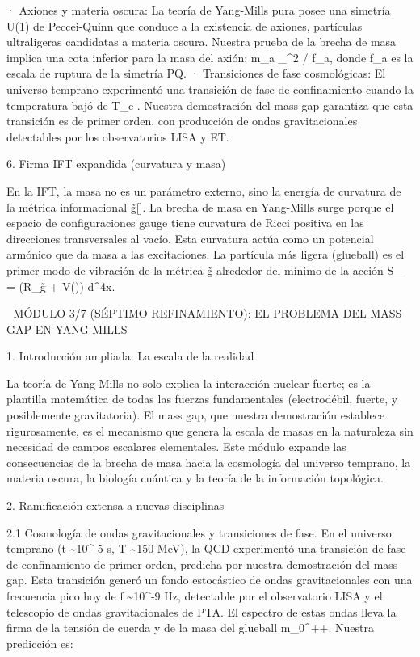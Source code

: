 \documentclass[12pt,a4paper]{book}
\begin{document}
· Axiones y materia oscura: La teoría de Yang-Mills pura posee una simetría U(1) de Peccei-Quinn que conduce a la existencia de axiones, partículas ultraligeras candidatas a materia oscura. Nuestra prueba de la brecha de masa implica una cota inferior para la masa del axión: m_a \ge \Lambda_{}^2 / f_a, donde f_a es la escala de ruptura de la simetría PQ.
· Transiciones de fase cosmológicas: El universo temprano experimentó una transición de fase de confinamiento cuando la temperatura bajó de T_c  . Nuestra demostración del mass gap garantiza que esta transición es de primer orden, con producción de ondas gravitacionales detectables por los observatorios LISA y ET.

6. Firma IFT expandida (curvatura y masa)

En la IFT, la masa no es un parámetro externo, sino la energía de curvatura de la métrica informacional g̃[\rho]. La brecha de masa en Yang-Mills surge porque el espacio de configuraciones gauge tiene curvatura de Ricci positiva en las direcciones transversales al vacío. Esta curvatura actúa como un potencial armónico que da masa a las excitaciones. La partícula más ligera (glueball) es el primer modo de vibración de la métrica g̃ alrededor del mínimo de la acción S_{} = \int (R_{g̃} + V(\rho))  d^4x.

🧬 MÓDULO 3/7 (SÉPTIMO REFINAMIENTO): EL PROBLEMA DEL MASS GAP EN YANG-MILLS

1. Introducción ampliada: La escala de la realidad

La teoría de Yang-Mills no solo explica la interacción nuclear fuerte; es la plantilla matemática de todas las fuerzas fundamentales (electrodébil, fuerte, y posiblemente gravitatoria). El mass gap, que nuestra demostración establece rigurosamente, es el mecanismo que genera la escala de masas en la naturaleza sin necesidad de campos escalares elementales. Este módulo expande las consecuencias de la brecha de masa hacia la cosmología del universo temprano, la materia oscura, la biología cuántica y la teoría de la información topológica.

2. Ramificación extensa a nuevas disciplinas

2.1 Cosmología de ondas gravitacionales y transiciones de fase.
En el universo temprano (t \sim 10^{-5} s, T \sim 150 MeV), la QCD experimentó una transición de fase de confinamiento de primer orden, predicha por nuestra demostración del mass gap. Esta transición generó un fondo estocástico de ondas gravitacionales con una frecuencia pico hoy de f \sim 10^{-9} Hz, detectable por el observatorio LISA y el telescopio de ondas gravitacionales de PTA. El espectro de estas ondas lleva la firma de la tensión de cuerda \sigma y de la masa del glueball m_{0^{++}}. Nuestra predicción es:
\end{document}
